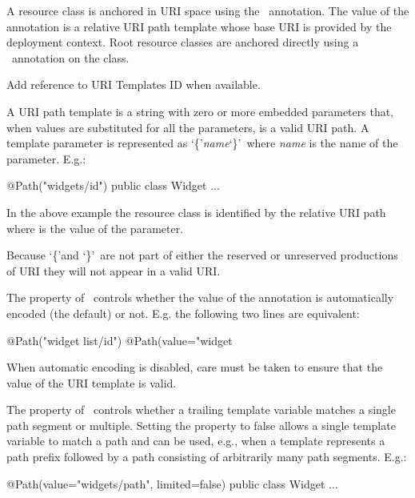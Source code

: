 A resource class is anchored in URI space using the \Path\ annotation. The value of the annotation is a relative URI path template whose base URI is provided by the deployment context. Root resource classes are anchored directly using a \Path\ annotation on the class.

\begin{ednote}Add reference to URI Templates ID when available.\end{ednote}

A URI path template is a string with zero or more embedded parameters that, when values are substituted for all the parameters, is a valid URI\cite{uri} path. A template parameter is represented as \lq\{\rq{\em name}\lq\}\rq\ where {\em name} is the name of the parameter. E.g.:

\begin{listing}{1}
@Path("widgets/{id}")
public class Widget {
  ...
}\end{listing}

In the above example the  resource class is identified by the relative URI path  where  is the value of the  parameter.

\begin{nnnote}Because \lq\{\rq and \lq\}\rq\ are not part of either the reserved or unreserved productions of URI\cite{uri} they will not appear in a valid URI.\end{nnnote}

The  property of \Path\ controls whether the value of the annotation is automatically encoded (the default) or not. E.g. the following two lines are equivalent:

\begin{listing}{1}
@Path("widget list/{id}")
@Path(value="widget%
\end{listing}

When automatic encoding is disabled, care must be taken to ensure that the value of the URI template is valid.

The  property of \Path\ controls whether a trailing template variable matches a single path segment or multiple. Setting the property to false allows a single template variable to match a path and can be used, e.g., when a template represents a path prefix followed by a path consisting of arbitrarily many path segments. E.g.:

\begin{listing}{1}
@Path(value="widgets/{path}", limited=false)
public class Widget {
  ...
}\end{listing}

